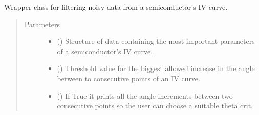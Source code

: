 \documentclass[letterpaper,10pt,english,openany, oneside]{sphinxmanual}
\begin{document}
\begin{fulllineitems}
\label{\detokenize{index:fompy.wrappers.filter}}
Wrapper class for filtering noisy data from a semiconductor’s IV curve.
\begin{quote}\begin{description}
\item[{Parameters}] \leavevmode\begin{itemize}
\item {} 
 () \textendash{} Structure of data containing the most important parameters of a semiconductor’s IV curve.

\item {} 
 () \textendash{} Threshold value for the biggest allowed increase in the angle between to consecutive points
of an IV curve.

\item {} 
 () \textendash{} If True it prints all the angle increments between two consecutive points so the user can
choose a suitable theta crit.

\end{itemize}

\end{description}\end{quote}

\end{fulllineitems}

\end{document}

